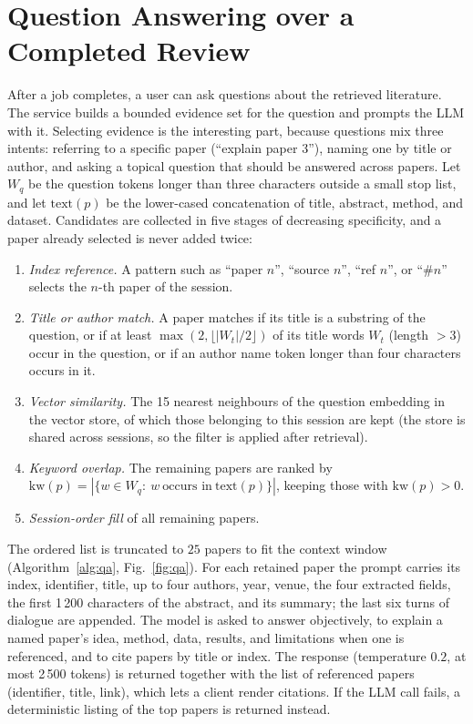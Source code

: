 \documentclass[conference]{IEEEtran}
\begin{document}
\section{Question Answering over a Completed Review}
\label{sec:qa}
After a job completes, a user can ask questions about the retrieved literature. The service builds a bounded evidence set for the question and prompts the LLM with it. Selecting evidence is the interesting part, because questions mix three intents: referring to a specific paper (``explain paper 3''), naming one by title or author, and asking a topical question that should be answered across papers. Let $W_q$ be the question tokens longer than three characters outside a small stop list, and let $\mathrm{text}(p)$ be the lower-cased concatenation of title, abstract, method, and dataset. Candidates are collected in five stages of decreasing specificity, and a paper already selected is never added twice:
\begin{enumerate}
\item[\textbf{A}] \emph{Index reference.} A pattern such as ``paper $n$'', ``source $n$'', ``ref $n$'', or ``\#$n$'' selects the $n$-th paper of the session.
\item[\textbf{B}] \emph{Title or author match.} A paper matches if its title is a substring of the question, or if at least $\max(2,\lfloor|W_t|/2\rfloor)$ of its title words $W_t$ (length $>3$) occur in the question, or if an author name token longer than four characters occurs in it.
\item[\textbf{C}] \emph{Vector similarity.} The 15 nearest neighbours of the question embedding in the vector store, of which those belonging to this session are kept (the store is shared across sessions, so the filter is applied after retrieval).
\item[\textbf{D}] \emph{Keyword overlap.} The remaining papers are ranked by $\mathrm{kw}(p)=|\{w\in W_q:\ w\ \text{occurs in}\ \mathrm{text}(p)\}|$, keeping those with $\mathrm{kw}(p)>0$.
\item[\textbf{E}] \emph{Session-order fill} of all remaining papers.
\end{enumerate}
The ordered list is truncated to $25$ papers to fit the context window (Algorithm~\ref{alg:qa}, Fig.~\ref{fig:qa}). For each retained paper the prompt carries its index, identifier, title, up to four authors, year, venue, the four extracted fields, the first 1\,200 characters of the abstract, and its summary; the last six turns of dialogue are appended. The model is asked to answer objectively, to explain a named paper's idea, method, data, results, and limitations when one is referenced, and to cite papers by title or index. The response (temperature $0.2$, at most 2\,500 tokens) is returned together with the list of referenced papers (identifier, title, link), which lets a client render citations. If the LLM call fails, a deterministic listing of the top papers is returned instead.
\end{document}
